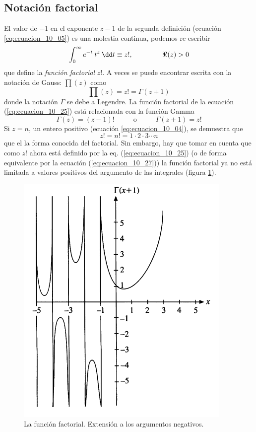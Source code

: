 \subsection{Notación factorial}
El valor de $-1$ en el exponente $z-1$ de la segunda definición (ecuación \ref{eq:ecuacion_10_05}) es una molestia continua, podemos re-escribir
\begin{equation}
\int_{0}^{\infty} e^{-t} \: t^{z} \: \dd t \equiv z!,  \hspace{1.5cm} \Re (z) > 0
\label{eq:ecuacion_10_25}
\end{equation}
que define la \emph{función factorial} $z!$. A veces se puede encontrar escrita con la notación de Gauss: $\prod (z)$ como
\begin{equation}
\prod(z) = z! = \Gamma (z + 1)
\label{eq:ecuacion_10_26}
\end{equation}
donde la notación $\Gamma$ se debe a Legendre. La función factorial de la ecuación (\ref{eq:ecuacion_10_25}) está relacionada con la función Gamma
\begin{equation}
\Gamma (z) = (z-1)! \hspace{1cm} \mbox{ o } \hspace{1cm} \Gamma (z + 1) = z!
\label{eq:ecuacion_10_27}
\end{equation}
Si $z=n$, un entero positivo (ecuación \ref{eq:ecuacion_10_04}), se demuestra que
\begin{equation}
z! = n! = 1 \cdot 2 \cdot 3 \cdots n
\label{eq:ecuacion_10_28}
\end{equation}
que el la forma conocida del factorial. Sin embargo, hay que tomar en cuenta que como $z!$ ahora está definido por la eq. (\ref{eq:ecuacion_10_25}) (o de forma equivalente por la ecuación (\ref{eq:ecuacion_10_27})) la función factorial ya no está limitada a valores positivos del argumento de las integrales (figura \ref{fig:figura_10_01}).
\begin{figure}[H]
    \centering
    \includegraphics[scale=0.6]{Imagenes/FuncionFactorial_01.png}
    \caption{La función factorial. Extensión a los argumentos negativos.}
    \label{fig:figura_10_01}
\end{figure}
